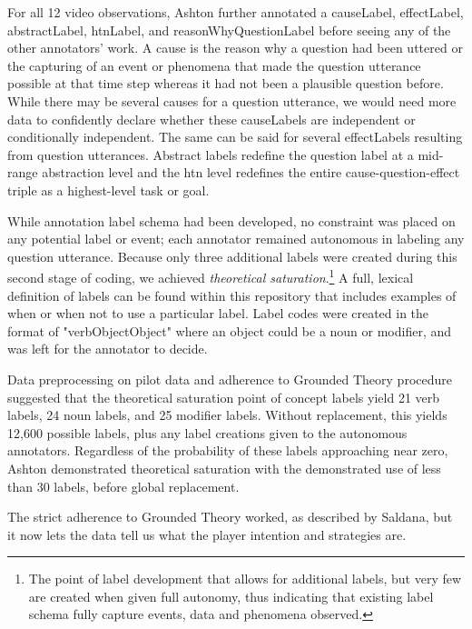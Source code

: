 \documentclass[10pt]{article}
\begin{document}
For all 12 video observations, Ashton further annotated a causeLabel, effectLabel, abstractLabel, htnLabel, and reasonWhyQuestionLabel before seeing any of the other annotators' work. A cause is the reason why a question had been uttered or the capturing of an event or phenomena that made the question utterance possible at that time step whereas it had not been a plausible question before. While there may be several causes for a question utterance, we would need more data to confidently declare whether these causeLabels are independent or conditionally independent. The same can be said for several effectLabels resulting from question utterances. Abstract labels redefine the question label at a mid-range abstraction level and the htn level redefines the entire cause-question-effect triple as a highest-level task or goal. 

While annotation label schema had been developed, no constraint was placed on any potential label or event; each annotator remained autonomous in labeling any question utterance. Because only three additional labels were created during this second stage of coding, we achieved \emph{theoretical saturation}.\footnote{The point of label development that allows for additional labels, but very few are created when given full autonomy, thus indicating that existing label schema fully capture events, data and phenomena observed.} A full, lexical definition of labels can be found within this repository that includes examples of when or when not to use a particular label. Label codes were created in the format of "verbObjectObject" where an object could be a noun or modifier, and was left for the annotator to decide.  


Data preprocessing on pilot data and adherence to Grounded Theory procedure suggested that the theoretical saturation point of concept labels  yield 21 verb labels, 24 noun labels, and 25 modifier labels. Without replacement, this yields 12,600 possible labels, plus any label creations given to the autonomous annotators. Regardless of the probability of these labels approaching near zero, Ashton demonstrated theoretical saturation with the demonstrated use of less than 30 labels, before global replacement.

The strict adherence to Grounded Theory worked, as described by Saldana, but it now lets the data tell us what the player intention and strategies are.
\end{document}
